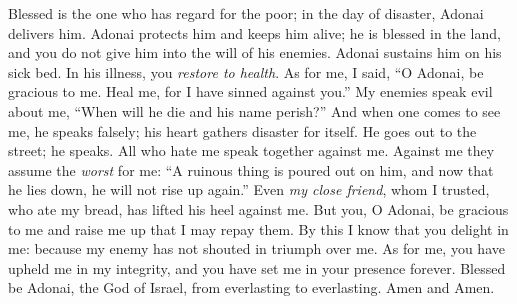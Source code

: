 \begin{biblechapter} %
 Blessed is the one who has regard for the poor; 
in the day of disaster, Adonai delivers him.
\verse Adonai protects him and keeps him alive; 
he is blessed in the land, 
and you do not give him 
into the will of his enemies.
\verse Adonai sustains him on his sick bed. 
In his illness, you \textit{restore to health}.
\verse As for me, I said, “O Adonai, be gracious to me. 
Heal me, for I have sinned against you.”
\verse My enemies speak evil about me, 
“When will he die and his name perish?”
\verse And when one comes to see me, he speaks falsely; 
his heart gathers disaster for itself. 
He goes out to the street; he speaks.
\verse All who hate me speak together against me. 
Against me they assume the \textit{worst} for me:
\verse “A ruinous thing is poured out on him, 
and now that he lies down, he will not rise up again.”
\verse Even \textit{my close friend}, whom I trusted, 
who ate my bread, 
has lifted his heel against me.
\verse But you, O Adonai, be gracious to me and raise me up 
that I may repay them.
\verse By this I know that you delight in me: 
because my enemy has not shouted in triumph over me.
\verse As for me, you have upheld me in my integrity, 
and you have set me in your presence forever.
\verse Blessed be Adonai, the God of Israel, 
from everlasting to everlasting. 
Amen and Amen.
\end{biblechapter}

